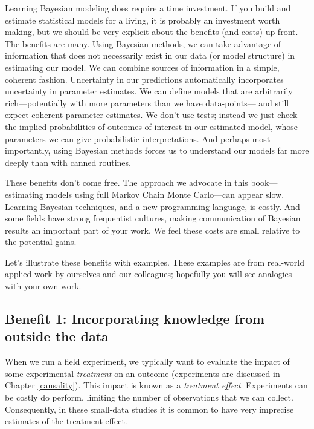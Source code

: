 \documentclass[]{book}
\begin{document}
Learning Bayesian modeling does require a time investment. If you build
and estimate statistical models for a living, it is probably an
investment worth making, but we should be very explicit about the
benefits (and costs) up-front. The benefits are many. Using Bayesian
methods, we can take advantage of information that does not necessarily
exist in our data (or model structure) in estimating our model. We can
combine sources of information in a simple, coherent fashion.
Uncertainty in our predictions automatically incorporates uncertainty in
parameter estimates. We can define models that are arbitrarily
rich---potentially with more parameters than we have data-points--- and
still expect coherent parameter estimates. We don't use tests; instead
we just check the implied probabilities of outcomes of interest in our
estimated model, whose parameters we can give probabilistic
interpretations. And perhaps most importantly, using Bayesian methods
forces us to understand our models far more deeply than with canned
routines.

These benefits don't come free. The approach we advocate in this
book---estimating models using full Markov Chain Monte Carlo---can
appear slow. Learning Bayesian techniques, and a new programming
language, is costly. And some fields have strong frequentist cultures,
making communication of Bayesian results an important part of your work.
We feel these costs are small relative to the potential gains.

Let's illustrate these benefits with examples. These examples are from
real-world applied work by ourselves and our colleagues; hopefully you
will see analogies with your own work.

\subsection*{Benefit 1: Incorporating knowledge from outside the
data}\label{benefit-1-incorporating-knowledge-from-outside-the-data}

When we run a field experiment, we typically want to evaluate the impact
of some experimental \emph{treatment} on an outcome (experiments are
discussed in Chapter \ref{causality}). This impact is known as a
\emph{treatment effect}. Experiments can be costly do perform, limiting
the number of observations that we can collect. Consequently, in these
small-data studies it is common to have very imprecise estimates of the
treatment effect.
\end{document}
